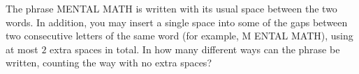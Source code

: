 The phrase MENTAL MATH is written with its usual space between the two words. In addition, you may insert a single space into some of the gaps between two consecutive letters of the same word (for example, M ENTAL MATH), using at most $2$ extra spaces in total. In how many different ways can the phrase be written, counting the way with no extra spaces?
